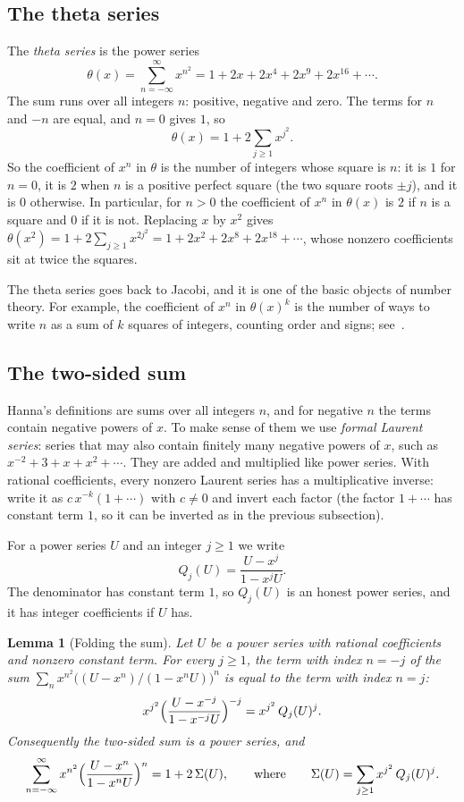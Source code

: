 \documentclass[11pt,a4paper]{article}
\newtheorem{lemma}[theorem]{Lemma}
\theoremstyle{definition}
\theoremstyle{remark}
\begin{document}
\subsection{The theta series}
The \emph{theta series} is the power series
\[
\theta(x)=\sum_{n=-\infty}^{\infty}x^{n^2}=1+2x+2x^4+2x^9+2x^{16}+\cdots .
\]
The sum runs over all integers $n$: positive, negative and zero. The terms for $n$ and $-n$ are equal, and $n=0$
gives $1$, so
\[
\theta(x)=1+2\sum_{j\ge1}x^{j^2}.
\]
So the coefficient of $x^n$ in $\theta$ is the number of integers whose square is $n$: it is $1$ for $n=0$, it is $2$
when $n$ is a positive perfect square (the two square roots $\pm j$), and it is $0$ otherwise. In particular, for
$n>0$ the coefficient of $x^n$ in $\theta(x)$ is $2$ if $n$ is a square and $0$ if it is not. Replacing $x$ by $x^2$
gives $\theta(x^2)=1+2\sum_{j\ge1}x^{2j^2}=1+2x^2+2x^8+2x^{18}+\cdots$, whose nonzero coefficients sit at twice the
squares.

The theta series goes back to Jacobi, and it is one of the basic objects of number theory. For example, the
coefficient of $x^n$ in $\theta(x)^k$ is the number of ways to write $n$ as a sum of $k$ squares of integers,
counting order and signs; see~\cite{grosswald}.

\subsection{The two-sided sum}\label{sec:fold}
Hanna's definitions are sums over all integers $n$, and for negative $n$ the terms contain negative powers of $x$. To
make sense of them we use \emph{formal Laurent series}: series that may also contain finitely many negative powers of
$x$, such as $x^{-2}+3+x+x^2+\cdots$. They are added and multiplied like power series. With rational coefficients,
every nonzero Laurent series has a multiplicative inverse: write it as $c\,x^{-k}(1+\cdots)$ with $c\ne0$ and invert
each factor (the factor $1+\cdots$ has constant term $1$, so it can be inverted as in the previous subsection).

For a power series $U$ and an integer $j\ge1$ we write
\[
Q_j(U)=\frac{U-x^j}{1-x^jU}.
\]
The denominator has constant term $1$, so $Q_j(U)$ is an honest power series, and it has integer coefficients if $U$
has.

\begin{lemma}[Folding the sum]\label{lem:fold}
Let $U$ be a power series with rational coefficients and nonzero constant term. For every $j\ge1$, the term with index
$n=-j$ of the sum $\sum_{n}x^{n^2}\bigl((U-x^n)/(1-x^nU)\bigr)^n$ is equal to the term with index $n=j$:
\[
x^{j^2}\Bigl(\frac{U-x^{-j}}{1-x^{-j}U}\Bigr)^{-j}=x^{j^2}\,Q_j(U)^j .
\]
Consequently the two-sided sum is a power series, and
\begin{equation}\label{eq:fold}
\sum_{n=-\infty}^{\infty}x^{n^2}\Bigl(\frac{U-x^n}{1-x^nU}\Bigr)^n=1+2\,\Sigma(U),
\qquad\text{where}\qquad
\Sigma(U)=\sum_{j\ge1}x^{j^2}\,Q_j(U)^j .
\end{equation}
\end{lemma}
\end{document}
